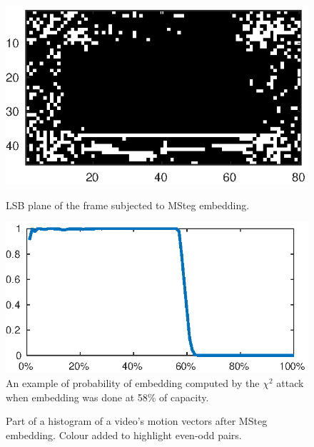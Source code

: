 \documentclass[12pt,british,twoside,notitlepage,usenames,dvipsnames,hypens,final]{report}
\numberwithin{equation}{section}
\numberwithin{figure}{section}
\begin{document}
\begin{figure}[tbh]
\centering
\begin{minipage}[t]{.4\textwidth}
  \centering
  \captionsetup{width=\textwidth}
  \includegraphics[scale=0.8]{img/msteg-visual.eps}
  \caption{LSB plane of the frame subjected to MSteg embedding.}
  \label{fig:msteg-visual}
\end{minipage}
\quad\quad
\begin{minipage}[t]{.45\textwidth}
  \centering
  \captionsetup{width=\textwidth}
  \includegraphics[scale=0.84]{img/chisq-attack.eps}
  \caption{An example of probability of embedding computed by the $\chi^2$ attack when embedding was done at 58\% of capacity.}
  \label{fig:chisq-attack}
\end{minipage}
\end{figure}

\begin{figure}[tbh]
\centering
\resizebox{0.6\textwidth}{!}{}
\caption{Part of a histogram of a video's motion vectors after MSteg embedding. Colour added to highlight even-odd pairs.}
\label{fig:msteg-hist}
\end{figure}
\end{document}
